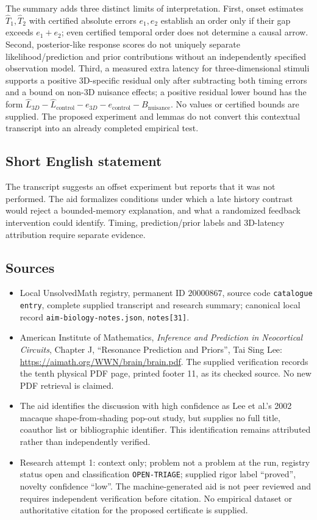 \documentclass[11pt]{article}
\begin{document}
The summary adds three distinct limits of interpretation. First, onset estimates $\widehat T_1,\widehat T_2$ with certified absolute errors $e_1,e_2$ establish an order only if their gap exceeds $e_1+e_2$; even certified temporal order does not determine a causal arrow. Second, posterior-like response scores do not uniquely separate likelihood/prediction and prior contributions without an independently specified observation model. Third, a measured extra latency for three-dimensional stimuli supports a positive 3D-specific residual only after subtracting both timing errors and a bound on non-3D nuisance effects; a positive residual lower bound has the form $\widehat L_{3D}-\widehat L_{\mathrm{control}}-e_{3D}-e_{\mathrm{control}}-B_{\mathrm{nuisance}}$. No values or certified bounds are supplied. The proposed experiment and lemmas do not convert this contextual transcript into an already completed empirical test.
\subsection{Short English statement}
The transcript suggests an offset experiment but reports that it was not performed. The aid formalizes conditions under which a late history contrast would reject a bounded-memory explanation, and what a randomized feedback intervention could identify. Timing, prediction/prior labels and 3D-latency attribution require separate evidence.
\subsection{Sources}
\begin{itemize}
\item Local UnsolvedMath registry, permanent ID $20000867$, source code \texttt{catalogue entry}, complete supplied transcript and research summary; canonical local record \texttt{aim-biology-notes.json}, \texttt{notes[31]}.
\item American Institute of Mathematics, \emph{Inference and Prediction in Neocortical Circuits}, Chapter J, ``Resonance Prediction and Priors'', Tai Sing Lee: \url{https://aimath.org/WWN/brain/brain.pdf}. The supplied verification records the tenth physical PDF page, printed footer 11, as its checked source. No new PDF retrieval is claimed.
\item The aid identifies the discussion with high confidence as Lee et al.'s 2002 macaque shape-from-shading pop-out study, but supplies no full title, coauthor list or bibliographic identifier. This identification remains attributed rather than independently verified.
\item Research attempt 1: context only; problem not a problem at the run, registry status open and classification \texttt{OPEN-TRIAGE}; supplied rigor label ``proved'', novelty confidence ``low''. The machine-generated aid is not peer reviewed and requires independent verification before citation. No empirical dataset or authoritative citation for the proposed certificate is supplied.
\end{itemize}
\end{document}
